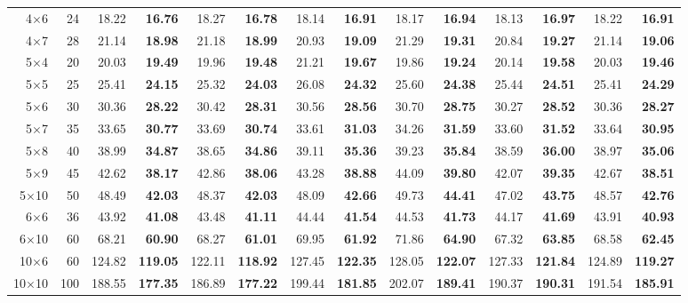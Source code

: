 \begin{table}[t]
\begin{tabular}{rrrrrrrrrrrrrr}
4$\times$6 & 24 & 18.22 & \textbf{16.76} & 18.27 & \textbf{16.78} & 18.14 & \textbf{16.91} & 18.17 & \textbf{16.94} & 18.13 & \textbf{16.97} & 18.22 & \textbf{16.91} \\
4$\times$7 & 28 & 21.14 & \textbf{18.98} & 21.18 & \textbf{18.99} & 20.93 & \textbf{19.09} & 21.29 & \textbf{19.31} & 20.84 & \textbf{19.27} & 21.14 & \textbf{19.06} \\
5$\times$4 & 20 & 20.03 & \textbf{19.49} & 19.96 & \textbf{19.48} & 21.21 & \textbf{19.67} & 19.86 & \textbf{19.24} & 20.14 & \textbf{19.58} & 20.03 & \textbf{19.46} \\
5$\times$5 & 25 & 25.41 & \textbf{24.15} & 25.32 & \textbf{24.03} & 26.08 & \textbf{24.32} & 25.60 & \textbf{24.38} & 25.44 & \textbf{24.51} & 25.41 & \textbf{24.29} \\
5$\times$6 & 30 & 30.36 & \textbf{28.22} & 30.42 & \textbf{28.31} & 30.56 & \textbf{28.56} & 30.70 & \textbf{28.75} & 30.27 & \textbf{28.52} & 30.36 & \textbf{28.27} \\
5$\times$7 & 35 & 33.65 & \textbf{30.77} & 33.69 & \textbf{30.74} & 33.61 & \textbf{31.03} & 34.26 & \textbf{31.59} & 33.60 & \textbf{31.52} & 33.64 & \textbf{30.95} \\
5$\times$8 & 40 & 38.99 & \textbf{34.87} & 38.65 & \textbf{34.86} & 39.11 & \textbf{35.36} & 39.23 & \textbf{35.84} & 38.59 & \textbf{36.00} & 38.97 & \textbf{35.06} \\
5$\times$9 & 45 & 42.62 & \textbf{38.17} & 42.86 & \textbf{38.06} & 43.28 & \textbf{38.88} & 44.09 & \textbf{39.80} & 42.07 & \textbf{39.35} & 42.67 & \textbf{38.51} \\
5$\times$10 & 50 & 48.49 & \textbf{42.03} & 48.37 & \textbf{42.03} & 48.09 & \textbf{42.66} & 49.73 & \textbf{44.41} & 47.02 & \textbf{43.75} & 48.57 & \textbf{42.76} \\
6$\times$6 & 36 & 43.92 & \textbf{41.08} & 43.48 & \textbf{41.11} & 44.44 & \textbf{41.54} & 44.53 & \textbf{41.73} & 44.17 & \textbf{41.69} & 43.91 & \textbf{40.93} \\
6$\times$10 & 60 & 68.21 & \textbf{60.90} & 68.27 & \textbf{61.01} & 69.95 & \textbf{61.92} & 71.86 & \textbf{64.90} & 67.32 & \textbf{63.85} & 68.58 & \textbf{62.45} \\
10$\times$6 & 60 & 124.82 & \textbf{119.05} & 122.11 & \textbf{118.92} & 127.45 & \textbf{122.35} & 128.05 & \textbf{122.07} & 127.33 & \textbf{121.84} & 124.89 & \textbf{119.27} \\
10$\times$10 & 100 & 188.55 & \textbf{177.35} & 186.89 & \textbf{177.22} & 199.44 & \textbf{181.85} & 202.07 & \textbf{189.41} & 190.37 & \textbf{190.31} & 191.54 & \textbf{185.91} \\
\bottomrule
\end{tabular}
\end{table}